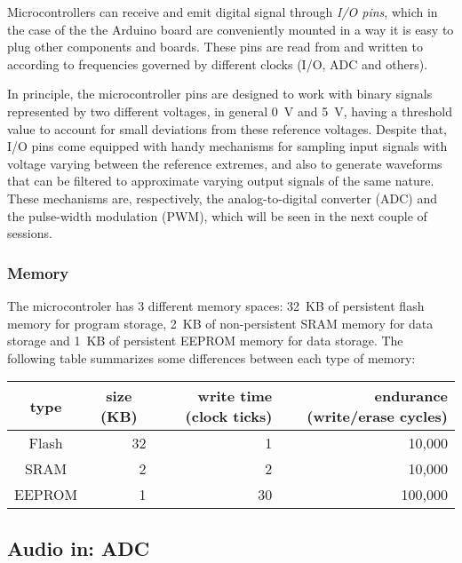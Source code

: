 Microcontrollers can receive and emit digital signal through \emph{I/O pins},
which in the case of the the Arduino board are conveniently mounted in a way
it is easy to plug other components and boards. These pins are read from and
written to according to frequencies governed by different clocks (I/O, ADC and
others).

In principle, the microcontroller pins are designed to work with binary
signals represented by two different voltages, in general 0~V and 5~V, having
a threshold value to account for small deviations from these reference
voltages. Despite that, I/O pins come equipped with handy mechanisms for
sampling input signals with voltage varying between the reference extremes,
and also to generate waveforms that can be filtered to approximate varying
output signals of the same nature. These mechanisms are, respectively, the
analog-to-digital converter (ADC) and the pulse-width modulation (PWM), which
will be seen in the next couple of sessions.


\subsubsection{Memory}

The microcontroler has 3 different memory spaces: 32~KB of persistent flash memory for
program storage, 2~KB of non-persistent SRAM memory for data storage and 1~KB
of persistent EEPROM memory for data storage. The following table summarizes
some differences between each type of memory:

\begin{center}
\begin{tabular}{crrr}
\toprule
\toprule
\multicolumn{1}{c}{\footnotesize{type}} &
\multicolumn{1}{c}{\footnotesize{size (KB)}} &
\footnotesize{\parbox{5em}{write time (clock ticks)}} &
\footnotesize{\parbox{5em}{endurance (write/erase cycles)}} \\
\midrule
Flash  & 32 & 1 & 10,000 \\
SRAM   & 2  & 2 & 10,000 \\
EEPROM & 1  & 30 & 100,000 \\ 
\bottomrule
\end{tabular}
\end{center}



\subsection{Audio in: ADC}


